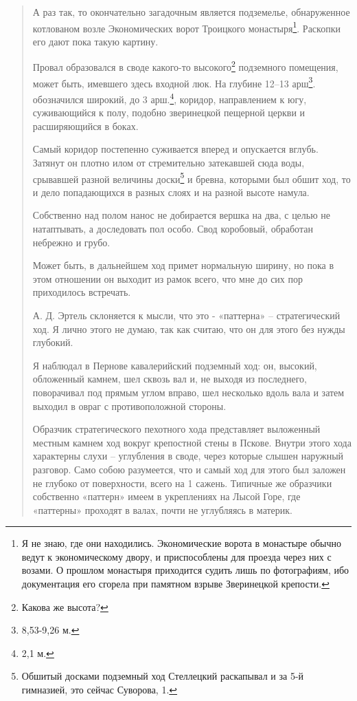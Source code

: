 \begin{quotation}
А раз так, то окончательно загадочным является подземелье, обнаруженное котлованом возле
Экономических ворот Троицкого монастыря\footnote{Я не знаю, где они находились. Экономические ворота в монастыре обычно ведут к экономическому двору, и приспособлены для проезда через них с возами. О прошлом монастыря приходится судить лишь по фотографиям, ибо документация его сгорела при памятном взрыве Зверинецкой крепости.}.
Раскопки его дают пока такую картину.

Провал образовался в своде какого-то высокого\footnote{Какова же высота?} подземного помещения, может быть, имевшего здесь входной люк. На глубине 12–13 арш\footnote{8,53-9,26 м.}.
обозначился широкий, до 3 арш.\footnote{2,1 м.}, коридор, направлением к югу, суживающийся к полу, подобно зверинецкой пещерной церкви и расширяющийся в боках. 

Самый коридор постепенно суживается вперед и опускается вглубь. Затянут он плотно илом от стремительно затекавшей сюда воды, срывавшей разной величины доски\footnote{Обшитый досками подземный ход Стеллецкий раскапывал и за 5-й гимназией, это сейчас Суворова, 1.} и бревна, которыми был обшит ход, то и дело попадающихся в разных слоях и на разной высоте намула.

Собственно над полом нанос не добирается
вершка на два, с целью не натаптывать, а доследовать пол особо. Свод коробовый, обработан небрежно и грубо.

Может быть, в дальнейшем ход примет нормальную ширину, но пока в этом отношении он выходит из рамок всего, что мне до сих пор приходилось встречать.

А. Д. Эртель склоняется к мысли, что это -
«паттерна» – стратегический ход. Я лично этого не думаю, так как считаю, что он для этого без нужды глубокий.

Я наблюдал в Пернове кавалерийский подземный ход: он, высокий, обложенный камнем, шел сквозь вал и, не выходя из последнего, поворачивал под прямым углом вправо, шел несколько вдоль вала и затем выходил в овраг с противоположной стороны.

Образчик стратегического пехотного хода
представляет выложенный местным камнем ход вокруг крепостной стены в Пскове. Внутри этого хода характерны слухи – углубления в своде, через которые слышен наружный разговор. Само собою разумеется, что и самый ход для этого был заложен не глубоко от поверхности, всего на 1 сажень. Типичные же образчики собственно «паттерн» имеем в укреплениях на Лысой Горе, где «паттерны» проходят в валах, почти не углубляясь в материк.


\end{quotation}
